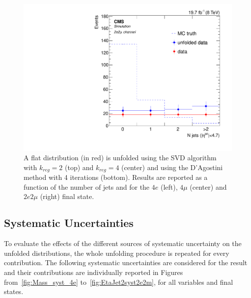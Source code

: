 \begin{figure}[hbtp]
\begin{center}
    \includegraphics[width=0.8\cmsFigWidth]{Figures/Unfolding/MCTests/Biased_Distributions/Jets_ZZTo2e2m_Mad_fr_bayes_4}
     \caption{A flat distribution (in red) is unfolded using the SVD algorithm with $k_{reg} = 2$ (top) and $k_{reg} = 4$ (center) and using the D'Agostini method with 4 iterations (bottom). Results are reported as a function of the number of jets and for the $4e$ (left), $4\mu$ (center) and $2e2\mu$ (right) final state.}
    \label{fig:Jets_biased}
  \end{center}
\end{figure}
\clearpage


\subsection{Systematic Uncertainties}
To evaluate the effects of the different sources of systematic uncertainty on the unfolded distributions, the whole unfolding procedure
is repeated for every contribution. The following systematic uncertainties are considered for the result and their contributions
are individually reported in Figures from~\ref{fig:Mass_syst_4e} to~\ref{fig:EtaJet2syst2e2m}, for all variables and final states.   
